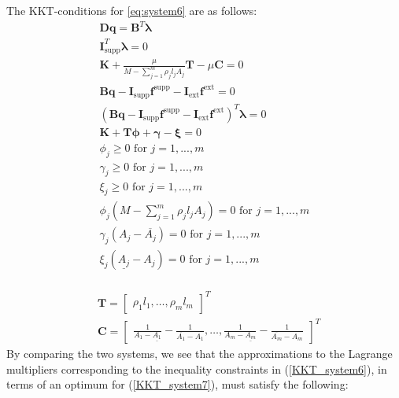 
The KKT-conditions for \eqref{eq:system6} are as follows:
\begin{equation}
\label{KKT_system7}
\begin{aligned}
\bm{Dq} = \bm{B}^{T}\bm{\lambda}\\
\bm{I}^{T}_{\textrm{supp}}\bm{\lambda} = 0 \\
\bm{K} + \frac{\mu}{M-\sum\limits_{j=1}^m\rho_{j}l_{j}A_{j}}\bm{T} - \mu\bm{C} = 0 \\
\bm{Bq} - \bm{I}_{\textrm{supp}}\bm{f}^{\textrm{supp}} - \bm{I}_{\textrm{ext}}\bm{f}^{\textrm{ext}} = 0 \\
(\bm{Bq} - \bm{I}_{\textrm{supp}}\bm{f}^{\textrm{supp}} - \bm{I}_{\textrm{ext}}\bm{f}^{\textrm{ext}})^T\bm{\lambda} = 0 \\
\bm{K} + \bm{T}\bm{\phi} + \bm{\gamma} - \bm{\xi} = 0 \\
\phi_j \geq 0  \text{ for } j = 1,...,m \\
\gamma_j \geq 0 \text{ for } j = 1,...,m \\
\xi_j \geq 0 \text{ for } j = 1,...,m \\
\phi_j(M-\sum\limits_{j=1}^m\rho_{j}l_{j}A_{j}) = 0 \text{ for } j = 1,...,m \\
\gamma_{j}(A_{j}-\overline{A_{j}}) = 0 \text{ for } j = 1,...,m \\
\xi_{j}(\underline{A_{j}}-A_{j}) = 0 \text{ for } j = 1,...,m \\
\end{aligned}
\end{equation}

\begin{align*}
&\bm{T} = \begin{bmatrix}
       \rho_{1}l_{1}
       , \hdots,\rho_{m}l_{m}
     \end{bmatrix}^T \\
&\bm{C} = \begin{bmatrix}
\frac{1}{A_1-\underline{A_{1}}} - \frac{1}{\overline{A_{1}}-A_{1}}, \hdots, \frac{1}{A_m-\underline{A_{m}}} - \frac{1}{\overline{A_{m}}-A_{m}}
\end{bmatrix}^T
\end{align*}
By comparing the two systems, we see that the approximations to the Lagrange multipliers corresponding to the inequality constraints in (\ref{KKT_system6}), in terms of an optimum for (\ref{KKT_system7}), must satisfy the following:

